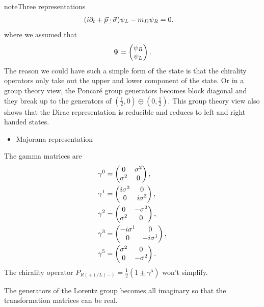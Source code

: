 \documentclass[letterpaper,12pt,english]{sphinxmanual}
\begin{document}
\begin{notice}{note}{Three representations}
\begin{gather}
\begin{split}
(i\partial_t + \vec p \cdot \vec \sigma) \psi_L - m_D\psi_R &= 0.\end{split}\notag
\end{gather}
where we assumed that
\begin{gather}
\begin{split}\Psi = \begin{pmatrix}  \psi_R \\ \psi_L \end{pmatrix}.\end{split}\notag
\end{gather}
The reason we could have such a simple form of the state is that the chirality operators only take out the upper and lower component of the state. Or in a group theory view, the Poncaré group generators becomes block diagonal and they break up to the generators of \((\frac{1}{2},0)\oplus (0,\frac{1}{2})\). This group theory view also shows that the Dirac representation is reducible and reduces to left and right handed states.
\begin{itemize}
\item {} 
Majorana representation

\end{itemize}

The gamma matrices are
\begin{gather}
\begin{split}\gamma^0 & = \begin{pmatrix} 0 & \sigma^2 \\ \sigma^2 & 0  \end{pmatrix}, \\
\gamma^1 & = \begin{pmatrix} i\sigma^3 & 0 \\ 0 & i \sigma^3  \end{pmatrix}, \\
\gamma^2 & = \begin{pmatrix} 0 & - \sigma^2 \\ \sigma^2 & 0   \end{pmatrix}, \\
\gamma^3 & = \begin{pmatrix} -i\sigma^1 & 0 \\ 0 & -i\sigma^1 \end{pmatrix}, \\
\gamma^5 & = \begin{pmatrix} \sigma^2 & 0 \\ 0 & -\sigma^2 \end{pmatrix}.\end{split}\notag
\end{gather}
The chirality operator \(P_{R(+)/L(-)} = \frac{1}{2}(1\pm \gamma^5)\) won't simplify.

The generators of the Lorentz group becomes all imaginary so that the transformation matrices can be real.
\end{notice}
\end{document}

